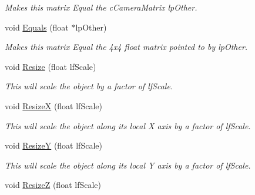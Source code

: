 \begin{DoxyCompactItemize}
\begin{DoxyCompactList}\small\item\em Makes this matrix Equal the cCameraMatrix lpOther. \end{DoxyCompactList}\item 
\hypertarget{classc_matrix4_adb76264fa82ef10ebb24b64d6293bc9d}{
void \hyperlink{classc_matrix4_adb76264fa82ef10ebb24b64d6293bc9d}{Equals} (float $\ast$lpOther)}
\label{classc_matrix4_adb76264fa82ef10ebb24b64d6293bc9d}

\begin{DoxyCompactList}\small\item\em Makes this matrix Equal the 4x4 float matrix pointed to by lpOther. \end{DoxyCompactList}\item 
\hypertarget{classc_matrix4_a4785b8464f65d9784db634f3a6f34e52}{
void \hyperlink{classc_matrix4_a4785b8464f65d9784db634f3a6f34e52}{Resize} (float lfScale)}
\label{classc_matrix4_a4785b8464f65d9784db634f3a6f34e52}

\begin{DoxyCompactList}\small\item\em This will scale the object by a factor of lfScale. \end{DoxyCompactList}\item 
\hypertarget{classc_matrix4_a6f721212ba596c5e80f85eba5b70766d}{
void \hyperlink{classc_matrix4_a6f721212ba596c5e80f85eba5b70766d}{ResizeX} (float lfScale)}
\label{classc_matrix4_a6f721212ba596c5e80f85eba5b70766d}

\begin{DoxyCompactList}\small\item\em This will scale the object along its local X axis by a factor of lfScale. \end{DoxyCompactList}\item 
\hypertarget{classc_matrix4_a77ef7c3392fd4d02ddfa4d206f91265b}{
void \hyperlink{classc_matrix4_a77ef7c3392fd4d02ddfa4d206f91265b}{ResizeY} (float lfScale)}
\label{classc_matrix4_a77ef7c3392fd4d02ddfa4d206f91265b}

\begin{DoxyCompactList}\small\item\em This will scale the object along its local Y axis by a factor of lfScale. \end{DoxyCompactList}\item 
\hypertarget{classc_matrix4_ac2789d9134f4b599f3f79f7b89c05af1}{
void \hyperlink{classc_matrix4_ac2789d9134f4b599f3f79f7b89c05af1}{ResizeZ} (float lfScale)}
\label{classc_matrix4_ac2789d9134f4b599f3f79f7b89c05af1}


\end{DoxyCompactItemize}
